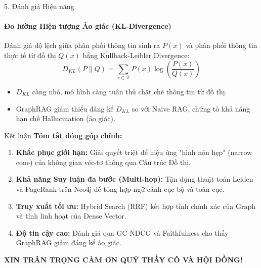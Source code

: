 \documentclass[aspectratio=169,xcolor=table]{beamer}
\begin{document}
\begin{frame}{5. Đánh giá Hiệu năng}
    \framesubtitle{Đo lường Hiện tượng Ảo giác (KL-Divergence)}
    Đánh giá độ lệch giữa phân phối thông tin sinh ra $P(x)$ và phân phối thông tin thực tế từ đồ thị $Q(x)$ bằng Kullback-Leibler Divergence:
    \begin{equation}
        D_{KL}(P \parallel Q) = \sum_{x \in \mathcal{X}} P(x) \log \left( \frac{P(x)}{Q(x)} \right)
    \end{equation}
    \begin{itemize}
        \item $D_{KL}$ càng nhỏ, mô hình càng tuân thủ chặt chẽ thông tin từ đồ thị.
        \item GraphRAG giảm thiểu đáng kể $D_{KL}$ so với Naive RAG, chứng tỏ khả năng hạn chế Hallucination (ảo giác).
    \end{itemize}
\end{frame}

\begin{frame}{Kết luận}
    \textbf{Tóm tắt đóng góp chính:}
    \begin{enumerate}
        \item \textbf{Khắc phục giới hạn:} Giải quyết triệt để hiệu ứng "hình nón hẹp" (narrow cone) của không gian véc-tơ thông qua Cấu trúc Đồ thị.
        \item \textbf{Khả năng Suy luận đa bước (Multi-hop):} Tận dụng thuật toán Leiden và PageRank trên Neo4j để tổng hợp ngữ cảnh cục bộ và toàn cục.
        \item \textbf{Truy xuất tối ưu:} Hybrid Search (RRF) kết hợp tính chính xác của Graph và tính linh hoạt của Dense Vector.
        \item \textbf{Độ tin cậy cao:} Đánh giá qua GC-NDCG và Faithfulness cho thấy GraphRAG giảm đáng kể ảo giác.
    \end{enumerate}
    
    \vspace{0.5cm}
    \begin{center}
        \textbf{\Large XIN TRÂN TRỌNG CẢM ƠN QUÝ THẦY CÔ VÀ HỘI ĐỒNG!}
    \end{center}
\end{frame}
\end{document}
